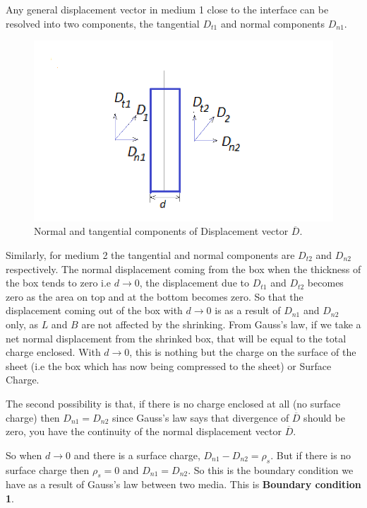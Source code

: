 Any general displacement vector in medium 1 close to the interface can be resolved into two components, the tangential $D_{t1}$ and normal components $D_{n1}$. 
\begin{figure}[h]
\centering
\includegraphics[width=1\linewidth]{./graphics/diemedium3}
\caption{Normal and tangential components of Displacement vector $\overline{D}$.}
\end{figure}
Similarly, for medium 2 the tangential and normal components are $D_{t2}$ and $D_{n2}$ respectively. The normal displacement coming from the box when the thickness of the box tends to zero i.e $d \longrightarrow 0$, the displacement due to $D_{t1}$ and $D_{t2}$ becomes zero as the area on top and at the bottom becomes zero. So that the displacement coming out of the box with $d \longrightarrow 0$ is as a result of $D_{n1}$ and $D_{n2}$ only, as $L$ and $B$ are not affected by the shrinking. From Gauss's law, if we take a net normal displacement from the shrinked box, that will be equal to the total charge enclosed. With $d \longrightarrow 0$, this is nothing but the charge on the surface of the sheet (i.e the box which has now being compressed to the sheet) or Surface Charge.

The second possibility is that, if there is no charge enclosed at all (no surface charge) then $D_{n1}= D_{n2}$ since Gauss's law says that divergence of $\overline{D}$ should be zero, you have the continuity of the normal displacement vector $\overline{D}$.

So when 
$d \longrightarrow 0$ and there is a surface charge, $D_{n1}- D_{n2} = \rho_s$. But if there is no surface charge then $\rho_s = 0$ and $D_{n1}= D_{n2}$. So this is the boundary condition we have as a result of Gauss's law between two media. This is \textbf{Boundary condition 1}.


